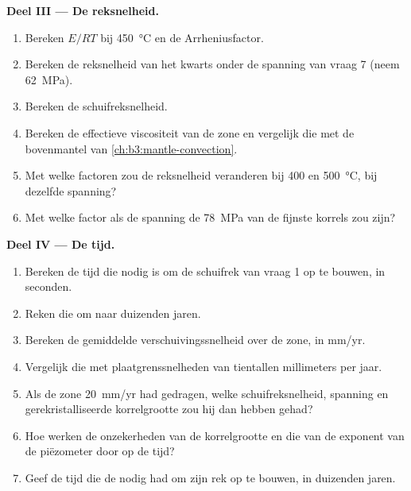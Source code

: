\begin{problem}
\medskip\noindent\textbf{Deel III --- De reksnelheid.}
\begin{enumerate}[resume]
  \item Bereken $E/RT$ bij \qty{450}{\celsius} en de Arrheniusfactor.
  \item Bereken de reksnelheid van het kwarts onder de spanning van vraag 7
        (neem \qty{62}{MPa}).
  \item Bereken de schuifreksnelheid.
  \item Bereken de effectieve viscositeit van de zone en vergelijk die met de
        bovenmantel van \cref{ch:b3:mantle-convection}.
  \item Met welke factoren zou de reksnelheid veranderen bij 400 en
        \qty{500}{\celsius}, bij dezelfde spanning?
  \item Met welke factor als de spanning de \qty{78}{MPa} van de fijnste
        korrels zou zijn?
\end{enumerate}

\medskip\noindent\textbf{Deel IV --- De tijd.}
\begin{enumerate}[resume]
  \item Bereken de tijd die nodig is om de schuifrek van vraag 1 op te bouwen,
        in seconden.
  \item Reken die om naar duizenden jaren.
  \item Bereken de gemiddelde verschuivingssnelheid over de zone, in \unit{mm/yr}.
  \item Vergelijk die met plaatgrenssnelheden van tientallen millimeters per jaar.
  \item Als de zone \qty{20}{mm/yr} had gedragen, welke schuifreksnelheid, spanning
        en gerekristalliseerde korrelgrootte zou hij dan hebben gehad?
  \item Hoe werken de onzekerheden van de korrelgrootte en die van de
        exponent van de piëzometer door op de tijd?
  \item Geef de tijd die de  nodig had om zijn rek op te bouwen, in
        duizenden jaren.
\end{enumerate}
\end{problem}
